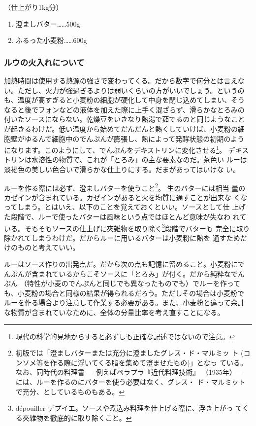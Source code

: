 \documentclass[twoside,12Q,b5paper]{escoffierltjsbook}
\def\tightlist{\itemsep1pt\parskip0pt\parsep0pt}
\begin{document}
（仕上がり1kg分）

\begin{enumerate}
\def\labelenumi{\arabic{enumi}.}
\tightlist
\item
  澄ましバター\ldots{}\ldots{}500g
\item
  ふるった小麦粉\ldots{}\ldots{}600g
\end{enumerate}

\subsubsection{ルウの火入れについて}\label{ux30ebux30a6ux306eux706bux5165ux308cux306bux3064ux3044ux3066}

加熱時間は使用する熱源の強さで変わってくる。だから数字で何分とは言えな
い。ただし、火力が強過ぎるよりは弱いくらいの方がいいでしょう。というの
も、温度が高すぎると小麦粉の細胞が硬化して中身を閉じ込めてしまい、そう
なると後でフォンなどの液体を加えた際に上手く混ざらず、滑らかなとろみの
付いたソースにならない。乾燥豆をいきなり熱湯で茹でるのと同じようなこと
が起きるわけだ。低い温度から始めてだんだんと熱くしていけば、小麦粉の細
胞壁がゆるんで細胞中のでんぷんが膨張し、熱によって発酵状態の初期のよう
になります。このようにして、でんぷんをデキストリンに変化させる\footnote{現代の科学的見地からすると必ずしも正確な記述ではないので注意。}。
デキストリンは水溶性の物質で、これが「とろみ」の主な要素なのだ。茶色い
ルーは淡褐色の美しい色合いで滑らかな仕上りにする。だまがあってはいけな
い。

ルーを作る際には必ず、澄ましバターを使うこと\footnote{初版では「澄ましバターまたは充分に澄ましたグレス・ド・マルミッ
  ト (コンソメ等を作る際に浮いてくる脂を集めて澄ませたもの)」となっ
  ている。なお、同時代の料理書 --- 例えばペラプラ『近代料理技術』
  （1935年）--- には、ルーを作るのにバターを使う必要はなく、グレス・
  ド・マルミットで充分、としているものもある。}。 生のバターには相当
量のカゼインが含まれている。カゼインがあると火を均質に通すことが出来な
くなってしまう。とはいえ、以下のことを覚えておくといい。ソースとして仕
上げた段階で、ルーで使ったバターは風味という点ではほとんど意味が失なわ
れている。そもそもソースの仕上げに夾雑物を取り除く\footnote{dépouiller
  デプイエ。ソースや煮込み料理を仕上げる際に、浮き上がっ
  てくる夾雑物を徹底的に取り除くこと。}段階でバターも
完全に取り除かれてしまうわけだ。だからルーに用いるバターは小麦粉に熱を
通すためだけのものと考えていい。

ルーはソース作りの出発点だ。だから次の点も記憶に留めること。小麦粉にで
んぷんが含まれているからこそソースに「とろみ」が付く。だから純粋なでん
ぷん （特性が小麦のでんぷんと同じでも異なったものでも）でルーを作って
も、小麦粉の場合と同様の結果が得られるだろう。ただしその場合は小麦粉で
ルーを作る場合より注意して作業する必要がある。また、小麦粉と違って余計
な物質が含まれていなために、全体の分量比率を考え直すことになる。
\end{document}
